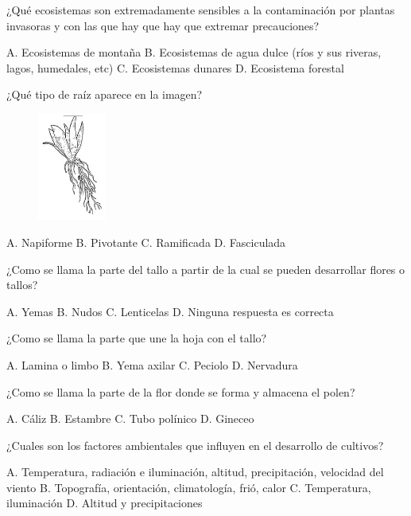 \documentclass[11pt]{exam}
\begin{document}
{\begin{questions}
\question ¿Qué ecosistemas son extremadamente sensibles a la contaminación por
  plantas invasoras y con las que hay que hay que extremar precauciones?
  \begin{checkboxes}
    \choice A. Ecosistemas de montaña
    \CorrectChoice B. Ecosistemas de agua dulce (ríos y sus
    riveras, lagos, humedales, etc)
    \choice C. Ecosistemas dunares
    \choice D. Ecosistema forestal
  \end{checkboxes}
\newpage
\question ¿Qué tipo de raíz aparece en la imagen?
  \begin{figure}[h!]
    \centering
    \includegraphics[width=0.2\textwidth]{fasciculada.PNG}
  \end{figure}
  \begin{checkboxes}
    \choice A. Napiforme
    \choice B. Pivotante
    \choice C. Ramificada
    \CorrectChoice D. Fasciculada
  \end{checkboxes}

\question ¿Como se llama la parte del tallo a partir de la cual se pueden
  desarrollar flores o tallos?
  \begin{checkboxes}
    \CorrectChoice A. Yemas
    \choice B. Nudos
    \choice C. Lenticelas
    \choice D. Ninguna respuesta es correcta
  \end{checkboxes}

\question ¿Como se llama la parte que une la hoja con el tallo?
  \begin{checkboxes}
    \choice A. Lamina o limbo
    \choice B. Yema axilar
    \CorrectChoice C. Peciolo
    \choice D. Nervadura
  \end{checkboxes}

\question ¿Como se llama la parte de la flor donde se forma y almacena el polen?
  \begin{checkboxes}
    \choice A. Cáliz
    \CorrectChoice B. Estambre
    \choice C. Tubo polínico
    \choice D. Gineceo
  \end{checkboxes}

\question ¿Cuales son los factores ambientales que influyen en el desarrollo de
  cultivos?
  \begin{checkboxes}
    \CorrectChoice A. Temperatura, radiación e iluminación, altitud, precipitación,
    velocidad del viento
    \choice B. Topografía, orientación, climatología, frió, calor
    \choice C. Temperatura, iluminación
    \choice D. Altitud y precipitaciones
  \end{checkboxes}
\end{questions}

}
\end{document}
